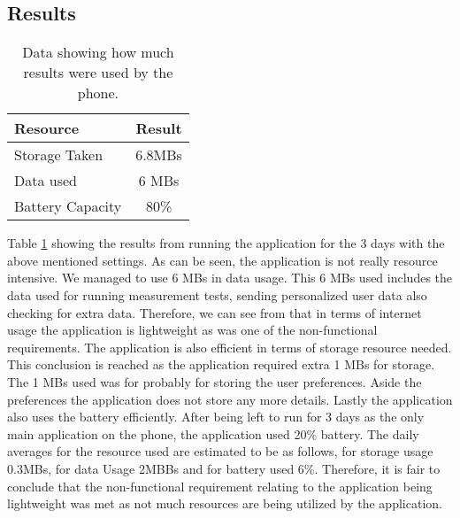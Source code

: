 \subsection{Results}\label{subsec:results}
\begin{table}[h!]
    \begin{center}
        \caption{Data showing how much results were used by the phone.}
        \label{tab:results}
        \begin{tabular}{l|c} %
            \textbf{Resource} & \textbf{Result}\\
            \hline
            Storage Taken & 6.8MBs \\
            \hline
            Data used & 6 MBs \\
            \hline
            Battery Capacity & 80\% \\
            \hline
        \end{tabular}
    \end{center}
\end{table}
Table \ref{tab:results} showing the results from running the application for the 3 days with the above mentioned settings.
As can be seen, the application is not really resource intensive.
We managed to use 6 MBs in data usage.
This 6 MBs used includes the data used for running measurement tests, sending personalized user data also checking for extra data.
Therefore, we can see from that in terms of internet usage the application is lightweight as was one of the non-functional requirements.
The application is also efficient in terms of storage resource needed.
This conclusion is reached as the application required extra 1 MBs for storage.
The 1 MBs used was for probably for storing the user preferences.
Aside the preferences the application does not store any more details.
Lastly the application also uses the battery efficiently.
After being left to run for 3 days as the only main application on the phone, the application used 20\% battery.
The daily averages for the resource used are estimated to be as follows, for storage usage  0.3MBs, for data Usage 2MBBs and for battery used 6\%.
Therefore, it is fair to conclude that the non-functional requirement relating to the application being lightweight was met as not much resources are being utilized by the application.